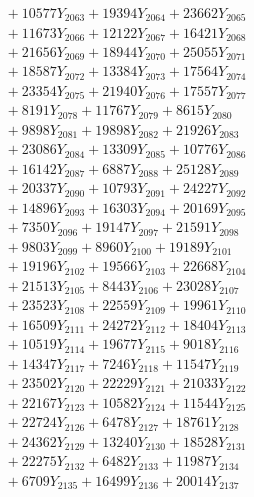 \documentclass[a4paper,10pt]{article}
\begin{document}
{\begin{align}
&\;  + 10577 Y_{2063} + 19394 Y_{2064} + 23662 Y_{2065} \\[0.3ex]
&\;  + 11673 Y_{2066} + 12122 Y_{2067} + 16421 Y_{2068} \\[0.5ex]\allowbreak
&\;  + 21656 Y_{2069} + 18944 Y_{2070} + 25055 Y_{2071} \\[0.3ex]
&\;  + 18587 Y_{2072} + 13384 Y_{2073} + 17564 Y_{2074} \\[0.3ex]
&\;  + 23354 Y_{2075} + 21940 Y_{2076} + 17557 Y_{2077} \\[0.3ex]
&\;  + 8191 Y_{2078} + 11767 Y_{2079} + 8615 Y_{2080} \\[0.3ex]
&\;  + 9898 Y_{2081} + 19898 Y_{2082} + 21926 Y_{2083} \\[0.3ex]
&\;  + 23086 Y_{2084} + 13309 Y_{2085} + 10776 Y_{2086} \\[0.3ex]
&\;  + 16142 Y_{2087} + 6887 Y_{2088} + 25128 Y_{2089} \\[0.3ex]
&\;  + 20337 Y_{2090} + 10793 Y_{2091} + 24227 Y_{2092} \\[0.3ex]
&\;  + 14896 Y_{2093} + 16303 Y_{2094} + 20169 Y_{2095} \\[0.3ex]
&\;  + 7350 Y_{2096} + 19147 Y_{2097} + 21591 Y_{2098} \\[0.5ex]\allowbreak
&\;  + 9803 Y_{2099} + 8960 Y_{2100} + 19189 Y_{2101} \\[0.3ex]
&\;  + 19196 Y_{2102} + 19566 Y_{2103} + 22668 Y_{2104} \\[0.3ex]
&\;  + 21513 Y_{2105} + 8443 Y_{2106} + 23028 Y_{2107} \\[0.3ex]
&\;  + 23523 Y_{2108} + 22559 Y_{2109} + 19961 Y_{2110} \\[0.3ex]
&\;  + 16509 Y_{2111} + 24272 Y_{2112} + 18404 Y_{2113} \\[0.3ex]
&\;  + 10519 Y_{2114} + 19677 Y_{2115} + 9018 Y_{2116} \\[0.3ex]
&\;  + 14347 Y_{2117} + 7246 Y_{2118} + 11547 Y_{2119} \\[0.3ex]
&\;  + 23502 Y_{2120} + 22229 Y_{2121} + 21033 Y_{2122} \\[0.3ex]
&\;  + 22167 Y_{2123} + 10582 Y_{2124} + 11544 Y_{2125} \\[0.3ex]
&\;  + 22724 Y_{2126} + 6478 Y_{2127} + 18761 Y_{2128} \\[0.5ex]\allowbreak
&\;  + 24362 Y_{2129} + 13240 Y_{2130} + 18528 Y_{2131} \\[0.3ex]
&\;  + 22275 Y_{2132} + 6482 Y_{2133} + 11987 Y_{2134} \\[0.3ex]
&\;  + 6709 Y_{2135} + 16499 Y_{2136} + 20014 Y_{2137} \\[0.3ex]

\end{align}}
\end{document}
